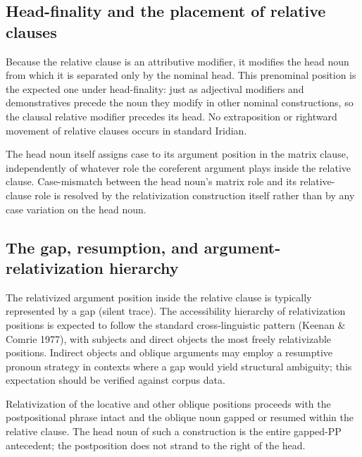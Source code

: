 \subsection{Head-finality and the placement of relative clauses}
\label{sec:th-rel-headfinal}

Because the relative clause is an attributive modifier, it modifies the
head noun from which it is separated only by the nominal head. This prenominal
position is the expected one under head-finality: just as adjectival modifiers
and demonstratives precede the noun they modify in other nominal constructions,
so the clausal relative modifier precedes its head. No extraposition or
rightward movement of relative clauses occurs in standard Iridian.

The head noun itself assigns case to its argument position in the matrix clause,
independently of whatever role the coreferent argument plays inside the relative
clause. Case-mismatch between the head noun's matrix role and its relative-clause
role is resolved by the relativization construction itself rather than by any
case variation on the head noun.

\subsection{The gap, resumption, and argument-relativization hierarchy}
\label{sec:th-rel-gap}


The relativized argument position inside the relative clause is typically
represented by a gap (silent trace). The accessibility hierarchy of
relativization positions is expected to follow the standard cross-linguistic
pattern (Keenan \& Comrie 1977), with subjects and direct objects the most
freely relativizable positions. Indirect objects and oblique arguments may
employ a resumptive pronoun strategy in contexts where a gap would yield
structural ambiguity; this expectation should be verified against corpus
data.

Relativization of the locative and other oblique positions proceeds with the
postpositional phrase intact and the oblique noun gapped or resumed within the
relative clause. The head noun of such a construction is the entire gapped-PP
antecedent; the postposition does not strand to the right of the head.



